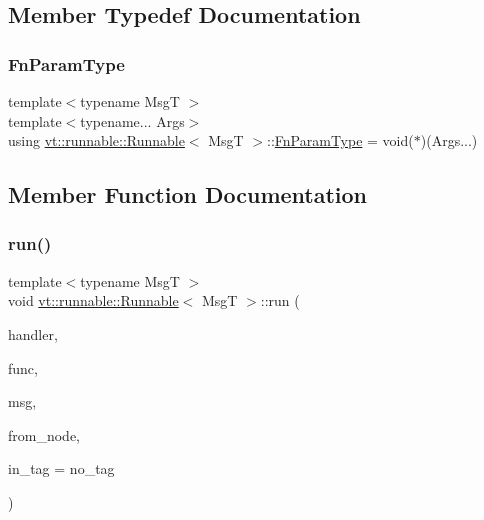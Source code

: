 \subsection{Member Typedef Documentation}
\mbox{\label{structvt_1_1runnable_1_1_runnable_aaad8725f31ab762ded7babaaf83574a3}} 
\subsubsection{\texorpdfstring{Fn\+Param\+Type}{FnParamType}}
{\footnotesize\ttfamily template$<$typename MsgT $>$ \\
template$<$typename... Args$>$ \\
using \hyperlink{structvt_1_1runnable_1_1_runnable}{vt\+::runnable\+::\+Runnable}$<$ MsgT $>$\+::\hyperlink{structvt_1_1runnable_1_1_runnable_aaad8725f31ab762ded7babaaf83574a3}{Fn\+Param\+Type} =  void($\ast$)(Args...)}



\subsection{Member Function Documentation}
\mbox{\label{structvt_1_1runnable_1_1_runnable_a8d99f9d7b1b29545b1595f40a1bd2845}} 
\subsubsection{\texorpdfstring{run()}{run()}}
{\footnotesize\ttfamily template$<$typename MsgT $>$ \\
void \hyperlink{structvt_1_1runnable_1_1_runnable}{vt\+::runnable\+::\+Runnable}$<$ MsgT $>$\+::run (\begin{DoxyParamCaption}\item[{\hyperlink{namespacevt_af64846b57dfcaf104da3ef6967917573}{Handler\+Type}}]{handler,  }\item[{\hyperlink{namespacevt_a70e19bd64d031e65083c2125b2c65426}{Active\+Fn\+Ptr\+Type}}]{func,  }\item[{MsgT $\ast$}]{msg,  }\item[{\hyperlink{namespacevt_a866da9d0efc19c0a1ce79e9e492f47e2}{Node\+Type}}]{from\+\_\+node,  }\item[{\hyperlink{namespacevt_a84ab281dae04a52a4b243d6bf62d0e52}{Tag\+Type}}]{in\+\_\+tag = {\ttfamily no\+\_\+tag} }\end{DoxyParamCaption})\hspace{0.3cm}{\ttfamily [static]}}



